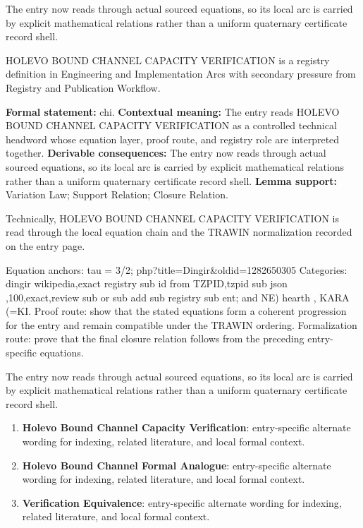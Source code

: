 The entry now reads through actual sourced equations, so its local arc is carried by explicit mathematical relations rather than a uniform quaternary certificate record shell.
\clearpage


\begingroup\small
{}
HOLEVO BOUND CHANNEL CAPACITY VERIFICATION is a registry definition in Engineering and Implementation Arcs with secondary pressure from Registry and Publication Workflow.

\begingroup\footnotesize\setlength{\emergencystretch}{3em}\sloppy
\textbf{Formal statement:} chi. \textbf{Contextual meaning:} The entry reads HOLEVO BOUND CHANNEL CAPACITY VERIFICATION as a controlled technical headword whose equation layer, proof route, and registry role are interpreted together. \textbf{Derivable consequences:} The entry now reads through actual sourced equations, so its local arc is carried by explicit mathematical relations rather than a uniform quaternary certificate record shell. \textbf{Lemma support:} Variation Law; Support Relation; Closure Relation.\par
\endgroup

Technically, HOLEVO BOUND CHANNEL CAPACITY VERIFICATION is read through the local equation chain and the TRAWIN normalization recorded on the entry page.

Equation anchors: tau = 3/2; php?title=Dingir\&oldid=1282650305 Categories: dingir wikipedia,exact registry sub id from TZPID,tzpid sub json ,100,exact,review sub or sub add sub registry sub ent; and NE) hearth , KARA  (=KI. Proof route: show that the stated equations form a coherent progression for the entry and remain compatible under the TRAWIN ordering. Formalization route: prove that the final closure relation follows from the preceding entry-specific equations.

The entry now reads through actual sourced equations, so its local arc is carried by explicit mathematical relations rather than a uniform quaternary certificate record shell.
\endgroup

\begin{enumerate}[leftmargin=1.6em,itemsep=6pt,topsep=4pt]
\item \textbf{Holevo Bound Channel Capacity Verification}: entry-specific alternate wording for indexing, related literature, and local formal context.
\item \textbf{Holevo Bound Channel Formal Analogue}: entry-specific alternate wording for indexing, related literature, and local formal context.
\item \textbf{Verification Equivalence}: entry-specific alternate wording for indexing, related literature, and local formal context.
\end{enumerate}

